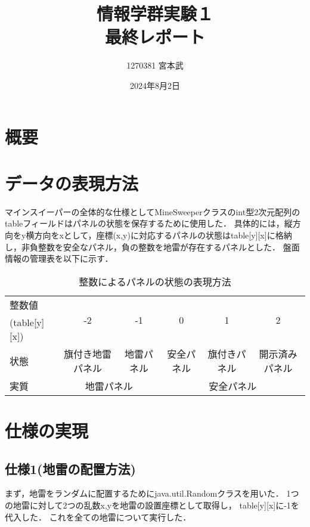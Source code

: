 \documentclass{jlreq}
\title{情報学群実験１ \\ \vspace{0.3cm} 最終レポート}
\author{1270381 宮本武}
\date{2024年8月2日}
\begin{document}
\maketitle
\setcounter{section}{-1}

\section{概要}


\section{データの表現方法}
マインスイーパーの全体的な仕様としてMineSweeperクラスのint型2次元配列のtableフィールドはパネルの状態を保存するために使用した．
具体的には，縦方向をy横方向をxとして，座標(x,y)に対応するパネルの状態はtable[y][x]に格納し，非負整数を安全なパネル，負の整数を地雷が存在するパネルとした．
盤面情報の管理表を以下に示す．
\vspace{0.5cm}
\begin{center}
    \begin{table}[h]
        \begin{tabular}{lccccc} \toprule[0.5mm]
            整数値 & \multirow{2}{*}{-2} & \multirow{2}{*}{-1} & \multirow{2}{*}{0} & \multirow{2}{*}{1} & \multirow{2}{*}{2} \\
            (table[y][x]) \\ \hline
            状態 & 旗付き地雷パネル & 地雷パネル & 安全パネル & 旗付きパネル & 開示済みパネル \\ \hline
            実質 & \multicolumn{2}{c|}{地雷パネル} & \multicolumn{3}{c}{安全パネル} \\ \hline
        \end{tabular}
        \caption{整数によるパネルの状態の表現方法}
    \end{table}
\end{center}

\section{仕様の実現}

\subsection{仕様1(地雷の配置方法)}
まず，地雷をランダムに配置するためにjava.util.Randomクラスを用いた．
1つの地雷に対して2つの乱数x,yを地雷の設置座標として取得し，
table[y][x]に-1を代入した．
これを全ての地雷について実行した．
\end{document}
